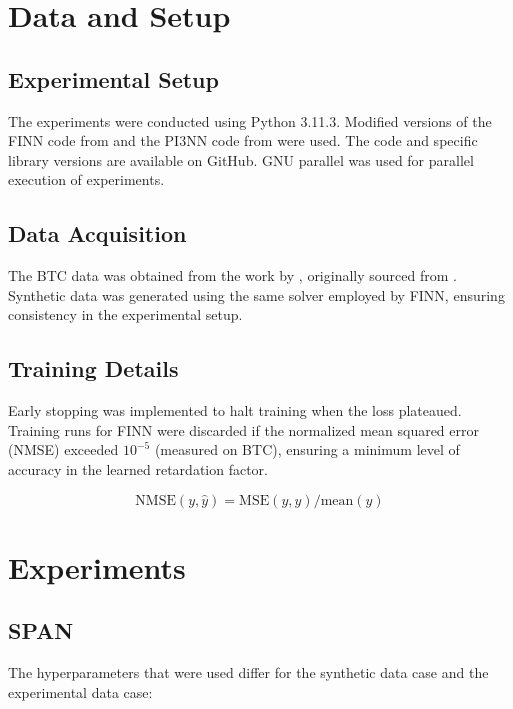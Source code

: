 \section{Data and Setup}

\subsection{Experimental Setup}
The experiments were conducted using Python 3.11.3. Modified versions of the FINN code from \cite{finn} and the PI3NN code from \cite{pi3nn} were used. The code and specific library versions are available on GitHub. GNU parallel \cite{tange_2023_10199085} was used for parallel execution of experiments. %

\subsection{Data Acquisition}
The BTC data was obtained from the work by \cite{finn}, originally sourced from \cite{nowak2016entropy}. Synthetic data was generated using the same solver employed by FINN, ensuring consistency in the experimental setup.

\subsection{Training Details}
Early stopping was implemented to halt training when the loss plateaued. Training runs for FINN were discarded if the normalized mean squared error (NMSE) exceeded $10^{-5}$ (measured on BTC), ensuring a minimum level of accuracy in the learned retardation factor.

\begin{equation*}
    \text{NMSE}(y, \hat{y}) = \text{MSE}(y, \hat{y}) / \text{mean}(y)
\end{equation*}




\section{Experiments}

\subsection{SPAN}
The hyperparameters that were used differ for the synthetic data case and the experimental data case:

